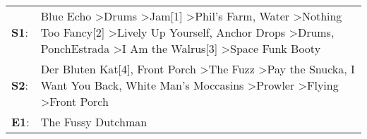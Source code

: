 \begin{supertabular}{p{0.03\textwidth}p{0.92\textwidth}}
 \textbf{S1}:  &  Blue Echo\textsuperscript{} \textgreater \enspace Drums\textsuperscript{} \textgreater \enspace Jam[1]\textsuperscript{} \textgreater \enspace Phil's Farm\textsuperscript{}, \enspace Water\textsuperscript{} \textgreater \enspace Nothing Too Fancy[2]\textsuperscript{} \textgreater \enspace Lively Up Yourself\textsuperscript{}, \enspace Anchor Drops\textsuperscript{} \textgreater \enspace Drums\textsuperscript{}, \enspace PonchEstrada\textsuperscript{} \textgreater \enspace I Am the Walrus[3]\textsuperscript{} \textgreater \enspace Space Funk Booty\textsuperscript{}  \enspace  \\
 \textbf{S2}:  &                                                                                                                                                        Der Bluten Kat[4]\textsuperscript{}, \enspace Front Porch\textsuperscript{} \textgreater \enspace The Fuzz\textsuperscript{} \textgreater \enspace Pay the Snucka\textsuperscript{}, \enspace I Want You Back\textsuperscript{}, \enspace White Man's Moccasins\textsuperscript{} \textgreater \enspace Prowler\textsuperscript{} \textgreater \enspace Flying\textsuperscript{} \textgreater \enspace Front Porch\textsuperscript{}  \enspace  \\
 \textbf{E1}:  &                                                                                                                                                                                                                                                                                                                                                                                                                                                                                                                                                        The Fussy Dutchman\textsuperscript{}  \enspace  \\
\end{supertabular}
